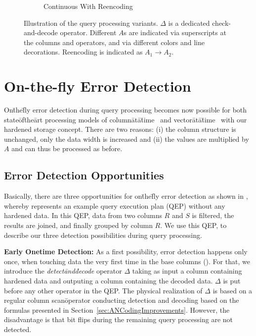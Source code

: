 \begin{figure}
\begin{subfigure}[b]{2.5cm}
		\caption{Continuous With Reencoding}
		\label{fig:QueryProcessing:reencoding}
	\end{subfigure}
	\hfill\null
	\vspace{-0.3cm}
	\caption{Illustration of the query processing variants. \(\Delta\) is a dedicated check-and-decode operator. Different \(A\)s are indicated via superscripts at the columns and operators, and via different colors and line decorations. Reencoding is indicated as \(A_1 \rightarrow A_2\).}%
	\label{fig:QueryProcessing}%
	\vspace{-0.3cm}
\end{figure}


\section{On-the-fly Error Detection}
\label{sec:ResilientQueryProcessing}




On\=the\=fly error detection during query processing becomes now possible for both state\=of\=the\=art processing models of column\=at\=a\=time~\cite{DBLP:journals/ftdb/AbadiBHIM13,DBLP:journals/debu/IdreosGNMMK12} and vector\=at\=a\=time~\cite{DBLP:conf/icde/ZukowskiWB12} with our hardened storage concept. There are two reasons: (i) the column structure is unchanged, only the data width is increased and (ii) the values are multiplied by \(A\) and can thus be processed as before. 

\subsection{Error Detection Opportunities}

Basically, there are three opportunities for on\=the\=fly error detection as shown in , whereby  represents an example query execution plan (QEP) without any hardened data. In this QEP, data from two columns \(R\) and \(S\) is filtered, the results are joined, and finally grouped by column \(R\). We use this QEP, to describe our three detection possibilities during query processing. 

\textbf{Early Onetime Detection: }
As a first possibility, error detection happens only once, when touching data the very first time in the base columns (). For that, we introduce the \emph{detect\=and\=decode} operator \(\Delta\) taking as input a column containing hardened data and outputing a column containing the decoded data. \(\Delta\) is put before any other operator in the QEP. The physical realization of \(\Delta\) is based on a regular column scan\=operator conducting detection and decoding based on the formulas presented in Section~\ref{sec:ANCodingImprovements}. However, the disadvantage is that bit flips during the remaining query processing are not detected.


